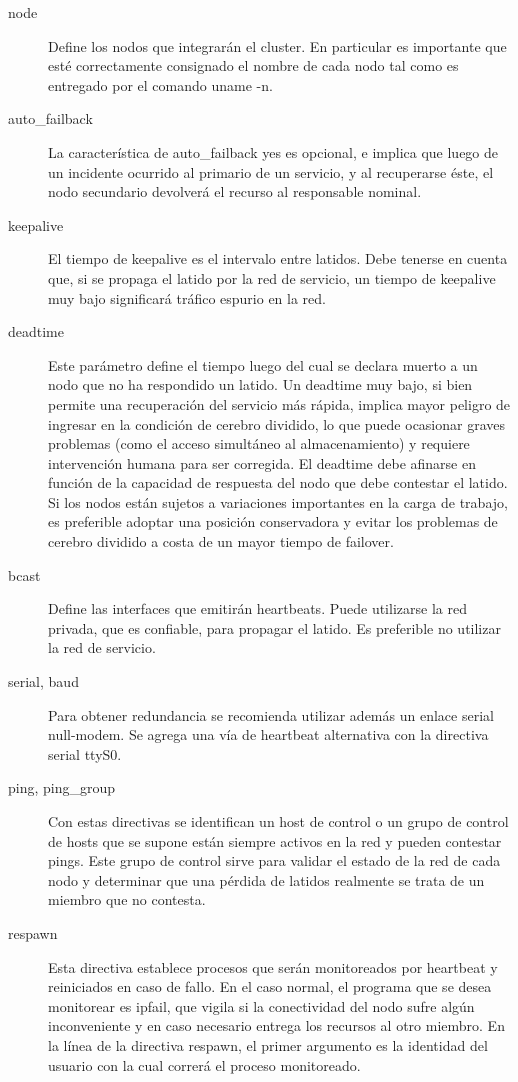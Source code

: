 \begin{description}
	\item [node] Define los nodos que integrarán el cluster. En particular es importante que esté correctamente consignado el nombre de cada nodo tal como es entregado por el comando uname -n.
	\item [auto\_failback] La característica de auto\_failback yes es opcional, e implica que luego de un incidente ocurrido al primario de un servicio, y al recuperarse éste, el nodo secundario devolverá el recurso al responsable nominal.
	\item [keepalive] El tiempo de keepalive es el intervalo entre latidos. Debe tenerse en cuenta que, si se propaga el latido por la red de servicio, un tiempo de keepalive muy bajo significará tráfico espurio en la red. 
	\item [deadtime]Este parámetro define el tiempo luego del cual se declara muerto a un nodo que no ha respondido un latido. Un deadtime muy bajo, si bien permite una recuperación del servicio más rápida, implica mayor peligro de ingresar en la condición de cerebro dividido, lo que puede ocasionar graves problemas (como el acceso simultáneo al almacenamiento) y requiere intervención humana para ser corregida. El deadtime debe afinarse en función de la capacidad de respuesta del nodo que debe contestar el latido. Si los nodos están sujetos a variaciones importantes en la carga de trabajo, es preferible adoptar una posición conservadora y evitar los problemas de cerebro dividido a costa de un mayor tiempo de failover.	 
	\item [bcast] Define las interfaces que emitirán heartbeats. Puede utilizarse la red privada, que es confiable, para propagar el latido. Es preferible no utilizar la red de servicio. 
	\item [serial, baud] Para obtener redundancia se recomienda utilizar además un enlace serial null-modem. Se agrega una vía de heartbeat alternativa con la directiva serial ttyS0.	
	\item[ping, ping\_group] Con estas directivas se identifican un host de control o un grupo de control de hosts que se supone están siempre activos en la red y pueden contestar pings. Este grupo de control sirve para validar el estado de la red de cada nodo y determinar que una pérdida de latidos realmente se trata de un miembro que no contesta.
	\item [respawn] Esta directiva establece procesos que serán monitoreados por heartbeat y reiniciados en caso de fallo. En el caso normal, el programa que se desea monitorear es ipfail, que vigila si la conectividad del nodo sufre algún inconveniente y en caso necesario entrega los recursos al otro miembro. En la línea de la directiva respawn, el primer argumento es la identidad del usuario con la cual correrá el proceso monitoreado.
\end{description}



